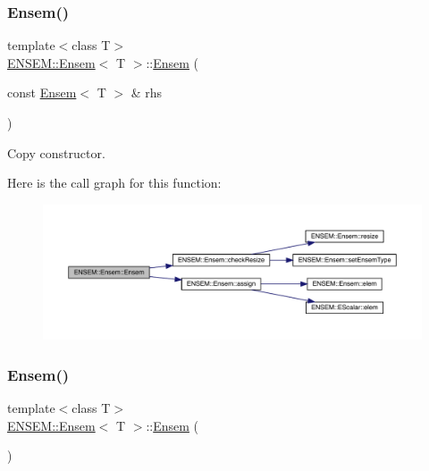 \subsubsection{\texorpdfstring{Ensem()}{Ensem()}\hspace{0.1cm}{\footnotesize\ttfamily [3/9]}}
{\footnotesize\ttfamily template$<$class T$>$ \\
\mbox{\hyperlink{classENSEM_1_1Ensem}{E\+N\+S\+E\+M\+::\+Ensem}}$<$ T $>$\+::\mbox{\hyperlink{classENSEM_1_1Ensem}{Ensem}} (\begin{DoxyParamCaption}\item[{const \mbox{\hyperlink{classENSEM_1_1Ensem}{Ensem}}$<$ T $>$ \&}]{rhs }\end{DoxyParamCaption})\hspace{0.3cm}{\ttfamily [inline]}}



Copy constructor. 

Here is the call graph for this function\+:
\nopagebreak
\begin{figure}[H]
\begin{center}
\leavevmode
\includegraphics[width=350pt]{d7/d3e/classENSEM_1_1Ensem_a5e80cf6ad71f96ba2fa28cac27f06003_cgraph}
\end{center}
\end{figure}
\mbox{\label{classENSEM_1_1Ensem_a8875b85c5536f02d10db536a815984b6}} 
\subsubsection{\texorpdfstring{Ensem()}{Ensem()}\hspace{0.1cm}{\footnotesize\ttfamily [4/9]}}
{\footnotesize\ttfamily template$<$class T$>$ \\
\mbox{\hyperlink{classENSEM_1_1Ensem}{E\+N\+S\+E\+M\+::\+Ensem}}$<$ T $>$\+::\mbox{\hyperlink{classENSEM_1_1Ensem}{Ensem}} (\begin{DoxyParamCaption}{ }\end{DoxyParamCaption})\hspace{0.3cm}{\ttfamily [inline]}}

